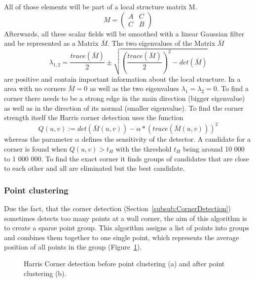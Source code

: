 All of those elements will be part of a local structure matrix M.
\begin{equation}M = \begin{pmatrix} A & C \\ C & B \end{pmatrix}\end{equation}
Afterwards, all three scalar fields will be smoothed with a linear Gaussian filter and be represented as a Matrix $\bar{M}$.
The two eigenvalues of the Matrix $\bar{M}$
\begin{equation}\lambda_{1,2} = \dfrac{trace(\bar{M})}{2} \pm \sqrt{(\dfrac{trace(\bar{M})}{2})^2 - det(\bar{M})} \end{equation}
are positive and contain important information about the local structure. In a area with no corners $\bar{M} = 0$  as well as the two eigenvalues $\lambda_1 = \lambda_2 = 0$. To find a corner there needs to be a strong edge in the main direction (bigger eigenvalue) as well as in the direction of its normal (smaller eigenvalue). 
To find the corner strength itself the Harris corner detection uses the function 
\begin{equation}Q(u,v) := det(\bar{M}(u,v)) - \alpha * (trace(\bar{M}(u,v)))^2\end{equation}
whereas the parameter $\alpha$ defines the sensitivity of the detector. A candidate for a corner is found when
$Q(u,v) > t_H$
with the threshold $t_{H}$ being around 10 000 to 1 000 000. To find the exact corner it finds groups of candidates that are close to each other and all are eliminated but the best candidate.

\subsubsection{Point clustering}
\label{sec:PointClustering}
Due the fact, that the corner detection (Section~\ref{subsub:CornerDetection}) sometimes detects too many points at a wall corner, the aim of this algorithm is to create a sparse point group. This algorithm assigns a list of points into groups and combines them together to one single point, which represents the average position of all points in the group (Figure~\ref{fig:HCPointClustering}).

\begin{figure}[h!]
	\centering
	\hfill
	\caption{Harris Corner detection before point clustering (a) and after point clustering (b).}
	\label{fig:HCPointClustering}
\end{figure}

